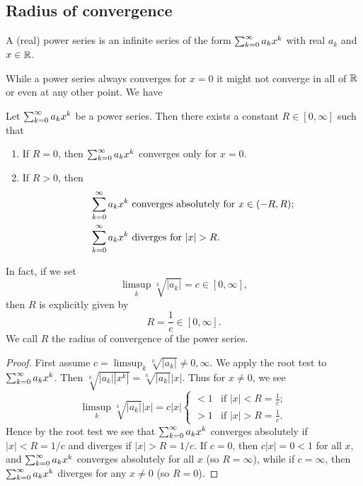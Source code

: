 \documentclass[10pt, a4paper]{article}
\newcommand{\infsumo}{\infsum[k = 0]}
\begin{document}
\subsection{Radius of convergence}

\begin{definition}
    A
    (real)
    power series is an infinite series of the form $\infsum[k = 0]a_kx ^ k$ with real $a_k$ and $x \in \R$.
\end{definition}

While a power series always converges for $x = 0$ it might not converge in all of $\R$ or even at any other point.
We have
\begin{theorem}
    Let $\infsumo a_kx ^ k$ be a power series.
    Then there exists a constant $R \in [0, \infty]$ such that
    \begin{enumerate}[label = (\roman*)]
        \item If $R = 0$,
        then $\infsumo a_kx ^ k$ converges only for $x = 0$.
        \item If $R > 0$,
        then
        \begin{align*}
            &\infsumo a_kx ^ k \text{ converges absolutely for $x \in (-R, R)$}; \\
            &\infsumo a_kx ^ k \text{ diverges for $|x| > R$}.
        \end{align*}
    \end{enumerate}
    In fact,
    if we set
    \[
    \limsup_{k}\sqrt[k]{|a_k|} = c \in [0, \infty],
    \]
    then $R$ is explicitly given by
    \[
    R = \frac{1}{c} \in [0, \infty].
    \]
    We call $R$ the radius of convergence of the power series.
    \begin{proof}
        First assume $c = \limsup_{k}\sqrt[k]{|a_k|} \neq 0, \infty$.
        We apply the root test to $\infsumo a_kx ^ k$.
        Then $\sqrt[k]{|a_k||x ^ k|} = \sqrt[k]{|a_k|}|x|$.
        Thus for $x \neq 0$,
        we see
        \[
        \limsup_{k}\sqrt[k]{|a_k|}|x| = c|x| \begin{cases}
            < 1 & \text{if } |x| < R = \frac{1}{c}; \\
            > 1 & \text{if } |x| > R = \frac{1}{c}.
        \end{cases}
        \]
        Hence by the root test we see that $\infsumo a_kx ^ k$ converges absolutely if $|x| < R = 1 / c$ and diverges if $|x| > R = 1 / c$.
        If $c = 0$,
        then $c|x| = 0 < 1$ for all $x$,
        and $\infsumo a_kx ^ k$ converges absolutely for all $x$
        (so $R = \infty$),
        while if $c = \infty$,
        then $\infsumo a_kx ^ k$ diverges for any $x \neq 0$
        (so $R = 0$).
    \end{proof}
\end{theorem}
\end{document}
